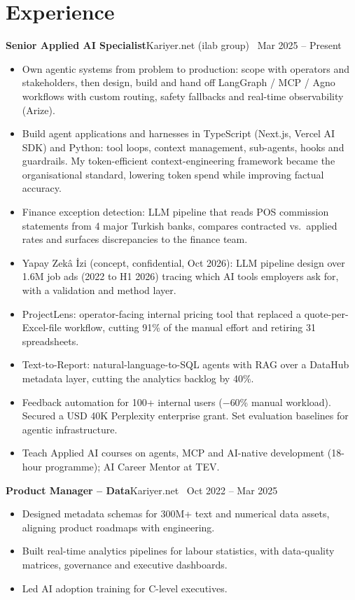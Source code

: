 \documentclass[10pt,a4paper]{article}
\newcommand{\role}[3]{%
  \par\needspace{3\baselineskip}\vspace{3pt}\textbf{#1}\hfill{\color{muted}#2 \textbar\ #3}\par}
\begin{document}
\section{Experience}
\role{Senior Applied AI Specialist}{Kariyer.net (ilab group)}{Mar 2025 -- Present}
\begin{itemize}
  \item Own agentic systems from problem to production: scope with operators and stakeholders, then design, build and
        hand off LangGraph / MCP / Agno workflows with custom routing, safety fallbacks and real-time observability (Arize).
  \item Build agent applications and harnesses in TypeScript (Next.js, Vercel AI SDK) and Python: tool loops, context
        management, sub-agents, hooks and guardrails. My token-efficient context-engineering framework became the
        organisational standard, lowering token spend while improving factual accuracy.
  \item Finance exception detection: LLM pipeline that reads POS commission statements from 4 major Turkish banks,
        compares contracted vs.\ applied rates and surfaces discrepancies to the finance team.
  \item Yapay Zek\^a \.Izi (concept, confidential, Oct 2026): LLM pipeline design over 1.6M job ads (2022 to H1 2026)
        tracing which AI tools employers ask for, with a validation and method layer.
  \item ProjectLens: operator-facing internal pricing tool that replaced a quote-per-Excel-file workflow, cutting 91\% of
        the manual effort and retiring 31 spreadsheets.
  \item Text-to-Report: natural-language-to-SQL agents with RAG over a DataHub metadata layer, cutting the analytics
        backlog by 40\%.
  \item Feedback automation for 100+ internal users ($-$60\% manual workload). Secured a USD 40K Perplexity enterprise
        grant. Set evaluation baselines for agentic infrastructure.
  \item Teach Applied AI courses on agents, MCP and AI-native development (18-hour programme); AI Career Mentor at TEV.
\end{itemize}

\role{Product Manager -- Data}{Kariyer.net}{Oct 2022 -- Mar 2025}
\begin{itemize}
  \item Designed metadata schemas for 300M+ text and numerical data assets, aligning product roadmaps with engineering.
  \item Built real-time analytics pipelines for labour statistics, with data-quality matrices, governance and executive dashboards.
  \item Led AI adoption training for C-level executives.
\end{itemize}
\end{document}
